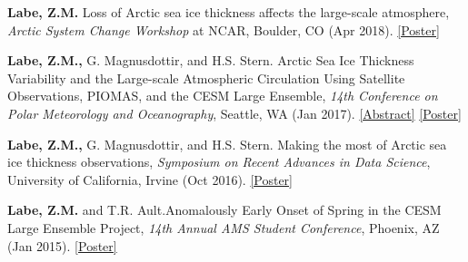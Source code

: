 \documentclass[margin,line,palatino,courier,10pt]{res}
\begin{document}
\begin{resume}
\begin{etaremune}[leftmargin=0in,topsep=0in,parsep=0in]
\item \textbf{Labe, Z.M.} Loss of Arctic sea ice thickness affects the large-scale atmosphere, \textit{Arctic System Change Workshop} at NCAR, Boulder, CO (Apr 2018). \href{https://zacklabe.files.wordpress.com/2022/08/ff668-zlabe_042018_bigideaposter.pdf}{[Poster]}
\item \textbf{Labe, Z.M.,} G. Magnusdottir, and H.S. Stern. Arctic Sea Ice Thickness Variability and the Large-scale Atmospheric Circulation Using Satellite Observations, PIOMAS, and the CESM Large Ensemble, \textit{14th Conference on Polar Meteorology and Oceanography}, Seattle, WA (Jan 2017). \href{https://ams.confex.com/ams/97Annual/webprogram/Paper313445.html}{[Abstract]} \href{https://zacklabe.files.wordpress.com/2022/08/c332e-zlabemagnusdottirstern_amsposter_2017.pdf}{[Poster]}
\item \textbf{Labe, Z.M.,} G. Magnusdottir, and H.S. Stern. Making the most of Arctic sea ice thickness observations, \textit{Symposium on Recent Advances in Data Science}, University of California, Irvine (Oct 2016). \href{https://zacklabe.files.wordpress.com/2022/08/c4b1e-zlabemagnusdottirstern_dsiposter_oct16.pdf}{[Poster]}
\item \textbf{Labe, Z.M.} and T.R. Ault.\@ Anomalously Early Onset of Spring in the CESM Large Ensemble Project, \textit{14th Annual AMS Student Conference}, Phoenix, AZ (Jan 2015). \href{https://ams.confex.com/ams/95Annual/webprogram/Paper271063.html}{[Poster]}

\end{etaremune}


\end{resume}
\end{document}
